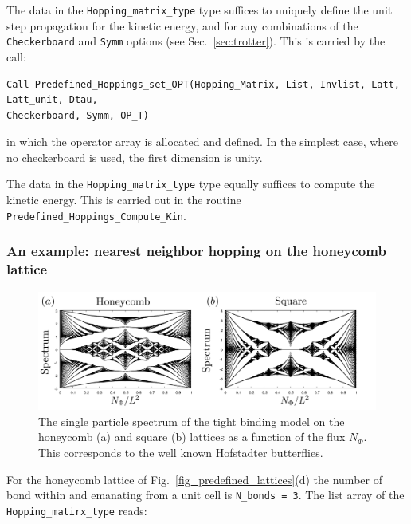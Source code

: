 The  data in the \texttt{Hopping\_matrix\_type} type suffices to uniquely define the  unit step propagation for the kinetic energy, and for  any combinations of the  \texttt{Checkerboard} and  \texttt{Symm}  options (see Sec.~\ref{sec:trotter}).   This is carried  by the call: 
\begin{lstlisting}[style=fortran]
Call Predefined_Hoppings_set_OPT(Hopping_Matrix, List, Invlist, Latt, Latt_unit, Dtau,
Checkerboard, Symm, OP_T)
\end{lstlisting}
in which  the  operator   array     is  allocated and defined.    In the simplest  case, where no  checkerboard is  used, the  first dimension  is  unity.


The   data in  the \texttt{Hopping\_matrix\_type} type   equally  suffices to compute  the kinetic energy.  This is carried out in the routine \texttt{Predefined\_Hoppings\_Compute\_Kin}.

\subsubsection{An example:   nearest neighbor hopping on the   honeycomb lattice }

\begin{figure}
\center
\includegraphics[width=\textwidth]{Figures/But.png}

\caption{  The   single particle spectrum  of the tight binding model on the  honeycomb  (a) and square (b) lattices as a function of the  flux  $N_\Phi$.    This corresponds to the well known  Hofstadter butterflies.  }
        \label{But.fig}
\end{figure}

For the honeycomb lattice of  Fig.~\ref{fig_predefined_lattices}(d)   the number of  bond within and emanating from  a unit cell is \texttt{N\_bonds = 3}.     The list array of the \texttt{Hopping\_matirx\_type} reads:

